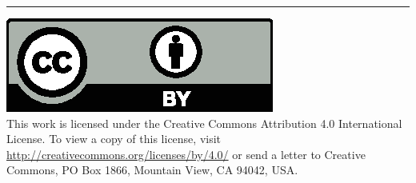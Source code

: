 \documentclass{article}
\begin{document}
\medskip
\hrule

{
  \small
  \includegraphics[scale=0.5]{cc-by.eps}\\
  This work is licensed under the Creative Commons Attribution 4.0
  International License. To view a copy of this license, visit
  \url{http://creativecommons.org/licenses/by/4.0/} or send a letter to Creative Commons, PO Box 1866, Mountain View, CA 94042, USA.
}
\end{document}
